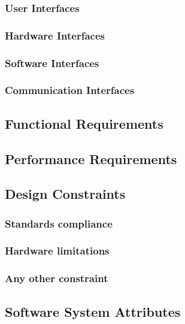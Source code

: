 \documentclass[12pt]{article}
\begin{document}
\subsubsection{User Interfaces}

\subsubsection{Hardware Interfaces}

\subsubsection{Software Interfaces}

\subsubsection{Communication Interfaces}

\subsection{Functional Requirements}

\subsection{Performance Requirements}

\subsection{Design Constraints}

\subsubsection{Standards compliance}

\subsubsection{Hardware limitations}

\subsubsection{Any other constraint}

\subsection{Software System Attributes}
\end{document}
